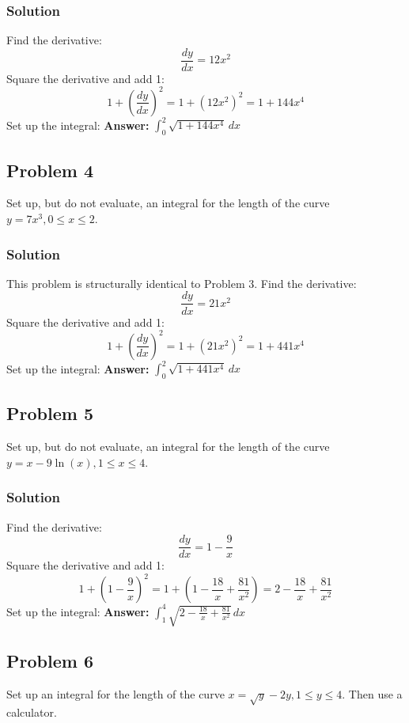 \documentclass{article}
\begin{document}
\subsubsection*{Solution}
Find the derivative:
\[ \frac{dy}{dx} = 12x^2 \]
Square the derivative and add 1:
\[ 1 + \left(\frac{dy}{dx}\right)^2 = 1 + (12x^2)^2 = 1 + 144x^4 \]
Set up the integral:
\textbf{Answer:} $ \int_{0}^{2} \sqrt{1 + 144x^4} \,dx $

\subsection{Problem 4}
Set up, but do not evaluate, an integral for the length of the curve $ y = 7x^3, 0 \le x \le 2 $.
\subsubsection*{Solution}
This problem is structurally identical to Problem 3.
Find the derivative:
\[ \frac{dy}{dx} = 21x^2 \]
Square the derivative and add 1:
\[ 1 + \left(\frac{dy}{dx}\right)^2 = 1 + (21x^2)^2 = 1 + 441x^4 \]
Set up the integral:
\textbf{Answer:} $ \int_{0}^{2} \sqrt{1 + 441x^4} \,dx $

\subsection{Problem 5}
Set up, but do not evaluate, an integral for the length of the curve $ y = x - 9\ln(x), 1 \le x \le 4 $.
\subsubsection*{Solution}
Find the derivative:
\[ \frac{dy}{dx} = 1 - \frac{9}{x} \]
Square the derivative and add 1:
\[ 1 + \left(1 - \frac{9}{x}\right)^2 = 1 + \left(1 - \frac{18}{x} + \frac{81}{x^2}\right) = 2 - \frac{18}{x} + \frac{81}{x^2} \]
Set up the integral:
\textbf{Answer:} $ \int_{1}^{4} \sqrt{2 - \frac{18}{x} + \frac{81}{x^2}} \,dx $

\subsection{Problem 6}
Set up an integral for the length of the curve $ x = \sqrt{y} - 2y, 1 \le y \le 4 $. Then use a calculator.
\end{document}
